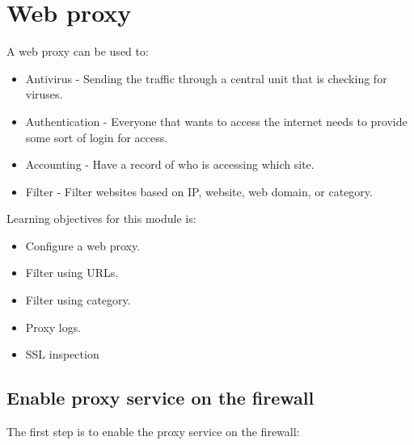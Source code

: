 \newpage

\section{Web proxy}

A web proxy can be used to:
\begin{itemize}
    \item Antivirus - Sending the traffic through a central unit that is checking for viruses.
    \item Authentication - Everyone that wants to access the internet needs to provide some sort of login for access.
    \item Accounting - Have a record of who is accessing which site. 
    \item Filter - Filter websites based on IP, website, web domain, or category.
\end{itemize}

Learning objectives for this module is:
\begin{itemize}
    \item Configure a web proxy.
    \item Filter using URLs.
    \item Filter using category.
    \item Proxy logs.
    \item SSL inspection
\end{itemize}


\subsection{Enable proxy service on the firewall}
The first step is to enable the proxy service on the firewall:



